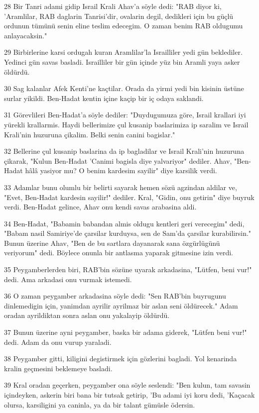 \par 28 Bir Tanri adami gidip Israil Krali Ahav'a söyle dedi: "RAB diyor ki, 'Aramlilar, RAB daglarin Tanrisi'dir, ovalarin degil, dedikleri için bu güçlü ordunun tümünü senin eline teslim edecegim. O zaman benim RAB oldugumu anlayacaksin."
\par 29 Birbirlerine karsi ordugah kuran Aramlilar'la Israilliler yedi gün beklediler. Yedinci gün savas basladi. Israilliler bir gün içinde yüz bin Aramli yaya asker öldürdü.
\par 30 Sag kalanlar Afek Kenti'ne kaçtilar. Orada da yirmi yedi bin kisinin üstüne surlar yikildi. Ben-Hadat kentin içine kaçip bir iç odaya saklandi.
\par 31 Görevlileri Ben-Hadat'a söyle dediler: "Duydugumuza göre, Israil krallari iyi yürekli krallarmis. Haydi bellerimize çul kusanip baslarimiza ip saralim ve Israil Krali'nin huzuruna çikalim. Belki senin canini bagislar."
\par 32 Bellerine çul kusanip baslarina da ip bagladilar ve Israil Krali'nin huzuruna çikarak, "Kulun Ben-Hadat 'Canimi bagisla diye yalvariyor" dediler. Ahav, "Ben-Hadat hâlâ yasiyor mu? O benim kardesim sayilir" diye karsilik verdi.
\par 33 Adamlar bunu olumlu bir belirti sayarak hemen sözü agzindan aldilar ve, "Evet, Ben-Hadat kardesin sayilir!" dediler. Kral, "Gidin, onu getirin" diye buyruk verdi. Ben-Hadat gelince, Ahav onu kendi savas arabasina aldi.
\par 34 Ben-Hadat, "Babamin babandan almis oldugu kentleri geri verecegim" dedi, "Babam nasil Samiriye'de çarsilar kurduysa, sen de Sam'da çarsilar kurabilirsin." Bunun üzerine Ahav, "Ben de bu sartlara dayanarak sana özgürlügünü veriyorum" dedi. Böylece onunla bir antlasma yaparak gitmesine izin verdi.
\par 35 Peygamberlerden biri, RAB'bin sözüne uyarak arkadasina, "Lütfen, beni vur!" dedi. Ama arkadasi onu vurmak istemedi.
\par 36 O zaman peygamber arkadasina söyle dedi: "Sen RAB'bin buyrugunu dinlemedigin için, yanimdan ayrilir ayrilmaz bir aslan seni öldürecek." Adam oradan ayrildiktan sonra aslan onu yakalayip öldürdü.
\par 37 Bunun üzerine ayni peygamber, baska bir adama giderek, "Lütfen beni vur!" dedi. Adam da onu vurup yaraladi.
\par 38 Peygamber gitti, kiligini degistirmek için gözlerini bagladi. Yol kenarinda kralin geçmesini beklemeye basladi.
\par 39 Kral oradan geçerken, peygamber ona söyle seslendi: "Ben kulun, tam savasin içindeyken, askerin biri bana bir tutsak getirip, 'Bu adami iyi koru dedi, 'Kaçacak olursa, karsiligini ya caninla, ya da bir talant gümüsle ödersin.
